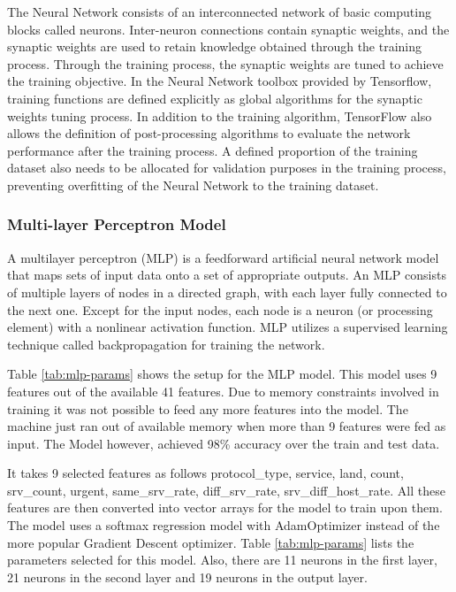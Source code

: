 \documentclass[12pt]{article}
\theoremstyle{definition}
\begin{document}
		The Neural Network consists of an interconnected network of basic computing blocks called
		neurons. Inter-neuron connections contain synaptic weights, and the synaptic weights are
		used to retain knowledge obtained through the training process. Through the training
		process, the synaptic weights are tuned to achieve the training objective. In the Neural Network
		toolbox provided by Tensorflow, training functions are defined explicitly as global
		algorithms for the synaptic weights tuning process. In addition to the training algorithm,
		TensorFlow also allows the definition of post-processing algorithms to evaluate the
		network performance after the training process. A defined proportion of the training
		dataset also needs to be allocated for validation purposes in the training process,
		preventing overfitting of the Neural Network to the training dataset.
	
		\subsubsection{Multi-layer Perceptron Model}
		A multilayer perceptron (MLP) is a feedforward artificial neural network model that maps sets of input data onto a set of appropriate outputs. An MLP consists of multiple layers of nodes in a directed graph, with each layer fully connected to the next one. Except for the input nodes, each node is a neuron (or processing element) with a nonlinear activation function. MLP utilizes a supervised learning technique called backpropagation for training the network.
		
		Table \ref{tab:mlp-params} shows the setup for the MLP model. This model uses 9 features out of the available 41 features. Due to memory constraints involved in training it was not possible to feed any more features into the model. The machine just ran out of available memory when more than 9 features were fed as input. The Model however, achieved 98\% accuracy over the train and test data.
		
		It takes 9 selected features as follows  protocol\_type, service, land, count, srv\_count, urgent, same\_srv\_rate, diff\_srv\_rate, srv\_diff\_host\_rate. All these features are then converted into vector arrays for the model to train upon them. The model uses a softmax regression model with AdamOptimizer instead of the more popular Gradient Descent optimizer. Table \ref{tab:mlp-params} lists the parameters selected for this model. Also, there are 11 neurons in the first layer, 21 neurons in the second layer and 19 neurons in the output layer.
		
\end{document}
